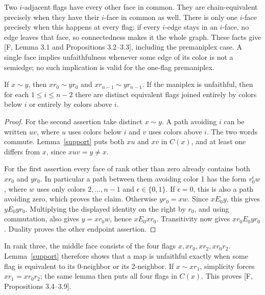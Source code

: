 \documentclass[a4paper,11pt]{article}
\begin{document}
Two $i$-adjacent flags have every other face in common. They are
chain-equivalent precisely when they have their $i$-face in common
as well. There is only one $i$-face precisely when this happens at
every flag: if every $i$-edge stays in an $i$-face, no edge leaves
that face, so connectedness makes it the whole graph. These facts
give [F, Lemma 3.1 and Propositions 3.2--3.3], including the
premaniplex case. A single face implies unfaithfulness whenever some
edge of its color is not a semiedge; no such implication is valid
for the one-flag premaniplex.

\begin{lemma}\label{endpoints}
If $x\sim y$, then $xr_0\sim yr_0$ and
$xr_{n-1}\sim yr_{n-1}$. If the maniplex is unfaithful, then for
each $1\leq i\leq n-2$ there are distinct equivalent flags joined
entirely by colors below $i$ or entirely by colors above $i$.
\end{lemma}
\begin{proof}
For the second assertion take distinct $x\sim y$. A path avoiding
$i$ can be written $uv$, where $u$ uses colors below $i$ and $v$
uses colors above $i$. The two words commute. Lemma~\ref{support}
puts both $xu$ and $xv$ in $C(x)$, and at least one differs from $x$,
since $xuv=y\ne x$.

For the first assertion every face of rank other than zero already
contains both $xr_0$ and $yr_0$. In particular a path between them
avoiding color 1 has the form $r_0^\epsilon w$, where $w$ uses only
colors $2,\ldots,n-1$ and $\epsilon\in\{0,1\}$. If $\epsilon=0$,
this is also a path avoiding zero, which proves the claim. Otherwise
$yr_0=xw$. Since $xE_0y$, this gives $yE_0yr_0$. Multiplying the
displayed identity on the right by $r_0$, and using commutation,
also gives $y=xr_0w$, hence $xE_0xr_0$. Transitivity now gives
$xr_0E_0yr_0$. Duality proves the other endpoint assertion.
\end{proof}

In rank three, the middle face consists of the four flags
$x,xr_0,xr_2,xr_0r_2$. Lemma~\ref{support} therefore shows that a
map is unfaithful exactly when some flag is equivalent to its
0-neighbor or its 2-neighbor. If $x\sim xr_1$, simplicity forces
$xr_1=xr_0r_2$; the same lemma then puts all four flags in $C(x)$.
This proves [F, Propositions 3.4--3.9].
\end{document}
